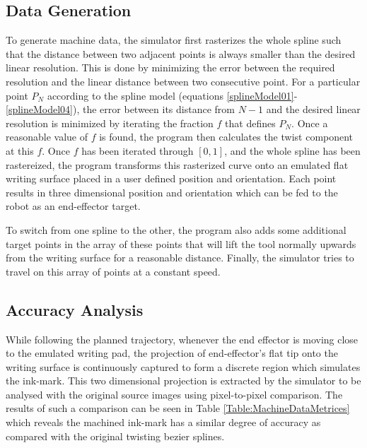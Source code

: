 \subsection{Data Generation}
    To generate machine data, the simulator first rasterizes the whole spline such that the distance between two adjacent points is always smaller than the desired linear resolution. This is done by minimizing the error between the required resolution and the linear distance between two consecutive point. For a particular point $P_N$ according to the spline model (equations \ref{splineModel01}-\ref{splineModel04}), the error between its distance from $N - 1$ and the desired linear resolution is minimized by iterating the fraction $f$ that defines $P_N$. Once a reasonable value of $f$ is found, the program then calculates the twist component at this $f$. Once $f$ has been iterated through $[0,1]$, and the whole spline has been rastereized, the program transforms this rasterized curve onto an emulated flat writing surface placed in a user defined position and orientation. Each point results in three dimensional position and orientation which can be fed to the robot as an end-effector target.
     
    To switch from one spline to the other, the program also adds some additional target points in the array of these points that will lift the tool normally upwards from the writing surface for a reasonable distance. Finally, the simulator tries to travel on this array of points at a constant speed.
\subsection{Accuracy Analysis}
    While following the planned trajectory, whenever the end effector is moving close to the emulated writing pad, the projection of end-effector's flat tip onto the writing surface is continuously captured to form a discrete region which simulates the ink-mark. This two dimensional projection is extracted by the simulator to be analysed with the original source images using pixel-to-pixel comparison. The results of such a comparison can be seen in Table \ref{Table:MachineDataMetrices} which reveals the machined ink-mark has a similar degree of accuracy as compared with the original twisting bezier splines.

